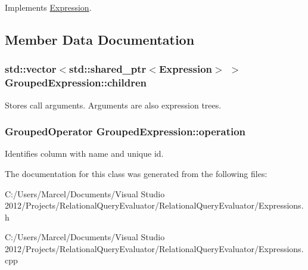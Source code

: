 Implements \hyperlink{class_expression_a77ac16bbb0df93de8a7711b2f7de889f}{Expression}.



\subsection{Member Data Documentation}
\hypertarget{class_grouped_expression_aabace43c5af51a0e913ff9033b71295c}{
\subsubsection[{children}]{\setlength{\rightskip}{0pt plus 5cm}std\+::vector$<$std\+::shared\+\_\+ptr$<${\bf Expression}$>$ $>$ Grouped\+Expression\+::children}}\label{class_grouped_expression_aabace43c5af51a0e913ff9033b71295c}
Stores call arguments. Arguments are also expression trees. \hypertarget{class_grouped_expression_a018f4f129a3b9b0be45c8ed10ff21813}{
\subsubsection[{operation}]{\setlength{\rightskip}{0pt plus 5cm}Grouped\+Operator Grouped\+Expression\+::operation}}\label{class_grouped_expression_a018f4f129a3b9b0be45c8ed10ff21813}
Identifies column with name and unique id. 

The documentation for this class was generated from the following files\+:\begin{DoxyCompactItemize}
\item 
C\+:/\+Users/\+Marcel/\+Documents/\+Visual Studio 2012/\+Projects/\+Relational\+Query\+Evaluator/\+Relational\+Query\+Evaluator/Expressions.\+h\item 
C\+:/\+Users/\+Marcel/\+Documents/\+Visual Studio 2012/\+Projects/\+Relational\+Query\+Evaluator/\+Relational\+Query\+Evaluator/Expressions.\+cpp\end{DoxyCompactItemize}
